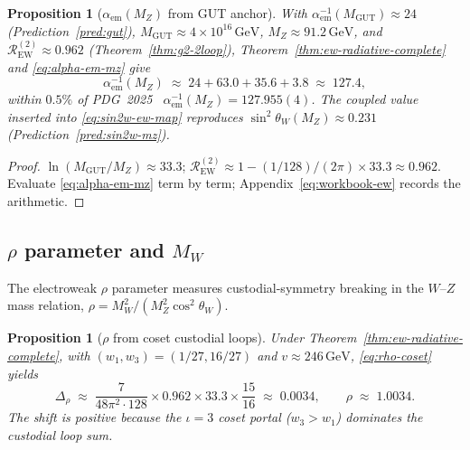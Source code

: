 \documentclass[11pt]{article}
\theoremstyle{plain}
\newtheorem{proposition}[theorem]{Proposition}
\theoremstyle{definition}
\theoremstyle{remark}
\numberwithin{equation}{section}
\begin{document}
\begin{proposition}[$\alpha_{\mathrm{em}}(M_Z)$ from GUT anchor]
\label{prop:alpha-em-mz}
With $\alpha_{\mathrm{em}}^{-1}(M_{\mathrm{GUT}})\approx24$
(Prediction~\ref{pred:gut}), $M_{\mathrm{GUT}}\approx4\times10^{16}\,\mathrm{GeV}$,
$M_Z\approx91.2\,\mathrm{GeV}$, and $\mathcal{R}_{\mathrm{EW}}^{(2)}\approx0.962$
(Theorem~\ref{thm:g2-2loop}), Theorem~\ref{thm:ew-radiative-complete} and
\eqref{eq:alpha-em-mz} give
\begin{equation}\label{eq:alpha-em-numeric}
  \alpha_{\mathrm{em}}^{-1}(M_Z)
  \;\approx\;
  24 + 63.0 + 35.6 + 3.8
  \;\approx\;
  127.4,
\end{equation}
within $0.5\%$ of PDG~2025~\cite{PDG2025}
$\alpha_{\mathrm{em}}^{-1}(M_Z)=127.955(4)$. The coupled value inserted into
\eqref{eq:sin2w-ew-map} reproduces $\sin^2\theta_W(M_Z)\approx0.231$
(Prediction~\ref{pred:sin2w-mz}).
\end{proposition}

\begin{proof}
$\ln(M_{\mathrm{GUT}}/M_Z)\approx33.3$;
$\mathcal{R}_{\mathrm{EW}}^{(2)}\approx1-(1/128)/(2\pi)\times33.3\approx0.962$.
Evaluate \eqref{eq:alpha-em-mz} term by term; Appendix~\eqref{eq:workbook-ew}
records the arithmetic.
\end{proof}

\subsection{\texorpdfstring{$\rho$}{rho} parameter and \texorpdfstring{$M_W$}{MW}}
\label{sec:ew-precision:rho-mw}

The electroweak $\rho$ parameter measures custodial-symmetry breaking in the
$W$--$Z$ mass relation,
$\rho=M_W^2/(M_Z^2\cos^2\theta_W)$.

\begin{proposition}[$\rho$ from coset custodial loops]
\label{prop:rho-parameter}
Under Theorem~\ref{thm:ew-radiative-complete}, with
$(w_1,w_3)=(1/27,16/27)$ and $v\approx246\,\mathrm{GeV}$,
\eqref{eq:rho-coset} yields
\begin{equation}\label{eq:rho-numeric}
  \Delta_\rho
  \;\approx\;
  \frac{7}{48\pi^2\cdot 128}\times 0.962\times 33.3\times\frac{15}{16}
  \;\approx\;
  0.0034,
  \qquad
  \rho \;\approx\; 1.0034.
\end{equation}
The shift is positive because the $\iota=3$ coset portal
($w_3>w_1$) dominates the custodial loop sum.
\end{proposition}
\end{document}
